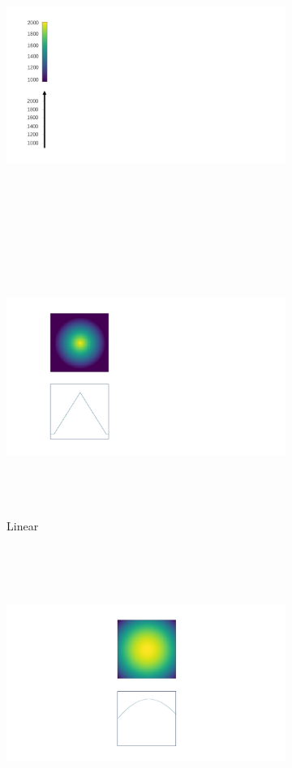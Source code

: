 \begin{figure}[htbp]
    \centering
    \begin{subfigure}{0.08\textwidth}
        \centering
        \includegraphics[height=9cm]{figures/temp_distribution_colorbar.pdf}
        \caption*{}        
    \end{subfigure}
    \begin{subfigure}{0.3\textwidth}
        \centering
        \includegraphics[height=9cm]{figures/temp_distribution_a.pdf}
        \caption{Linear}
        \label{fig: linear_distribution}        
    \end{subfigure}
    \begin{subfigure}{0.3\textwidth}
        \centering
        \includegraphics[height=9cm]{figures/temp_distribution_b.pdf}

\end{subfigure}
\end{figure}
